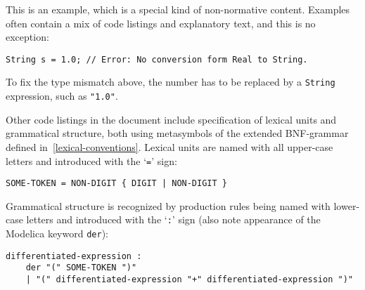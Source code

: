 \begin{example}
This is an example, which is a special kind of non-normative content.
Examples often contain a mix of code listings and explanatory text, and this is no exception:
\begin{lstlisting}[language=modelica]
String s = 1.0; // Error: No conversion form Real to String.
\end{lstlisting}
To fix the type mismatch above, the number has to be replaced by a \lstinline!String! expression, such as \lstinline!"1.0"!.
\end{example}

Other code listings in the document include specification of lexical units and grammatical structure, both using metasymbols of the extended BNF-grammar defined in~\cref{lexical-conventions}.
Lexical units are named with all upper-case letters and introduced with the `\lstinline[language=grammar]!=!' sign:
\begin{lstlisting}[language=grammar]
SOME-TOKEN = NON-DIGIT { DIGIT | NON-DIGIT }
\end{lstlisting}
Grammatical structure is recognized by production rules being named with lower-case letters and introduced with the `\lstinline[language=grammar]!:!' sign (also note appearance of the Modelica keyword \lstinline!der!):
\begin{lstlisting}[language=grammar]
differentiated-expression :
    der "(" SOME-TOKEN ")"
    | "(" differentiated-expression "+" differentiated-expression ")"
\end{lstlisting}
